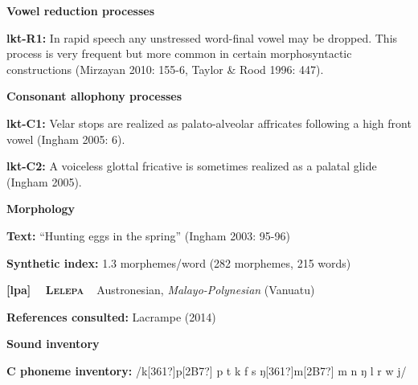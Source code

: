 \begin{styleBody}
\textbf{Vowel reduction processes}
\end{styleBody}

\begin{styleBody}
\textbf{lkt-R1: }In rapid speech any unstressed word-final vowel may be dropped. This process is very frequent but more common in certain morphosyntactic constructions (Mirzayan 2010: 155-6, Taylor \& Rood 1996: 447).
\end{styleBody}

\begin{styleBody}
\textbf{Consonant allophony processes}
\end{styleBody}

\begin{styleBody}
\textbf{lkt-C1: }Velar stops are realized as palato-alveolar affricates following a high front vowel (Ingham 2005: 6).
\end{styleBody}

\begin{styleBody}
\textbf{lkt-C2: }A voiceless glottal fricative is sometimes realized as a palatal glide (Ingham 2005).
\end{styleBody}

\begin{styleBody}
\textbf{Morphology}
\end{styleBody}

\begin{styleBody}
\textbf{Text:} “Hunting eggs in the spring” (Ingham 2003: 95-96)
\end{styleBody}

\begin{styleBody}
\textbf{Synthetic index: }1.3 morphemes/word (282 morphemes, 215 words)
\end{styleBody}

\clearpage\begin{styleBody}
\textbf{[lpa] }\ \ \textbf{\textsc{Lelepa}}\textbf{\ \ }Austronesian, \textit{Malayo-Polynesian} (Vanuatu)
\end{styleBody}

\begin{styleBody}
\textbf{References consulted: }Lacrampe (2014)
\end{styleBody}

\begin{styleBody}
\textbf{Sound inventory}
\end{styleBody}

\begin{styleBody}
\textbf{C phoneme inventory:} /k[361?]p[2B7?] p t k f s ŋ[361?]m[2B7?] m n ŋ l r w j/
\end{styleBody}

